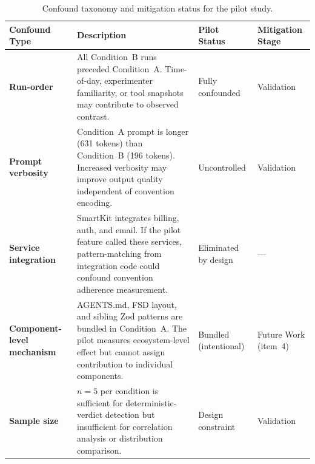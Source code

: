 \begin{table}[ht]
\centering
\footnotesize
\renewcommand{\arraystretch}{1.3}
\caption{Confound taxonomy and mitigation status for the pilot study.}
\label{tbl:confound-taxonomy}
\begin{tabular}{@{}p{3.2cm}p{5.5cm}p{3.8cm}p{2cm}@{}}
\toprule
\textbf{Confound Type} & \textbf{Description} & \textbf{Pilot Status} & \textbf{Mitigation Stage} \\
\midrule
\textbf{Run-order} & All Condition~B runs preceded Condition~A. Time-of-day, experimenter familiarity, or tool snapshots may contribute to observed contrast. & Fully confounded & Validation \\
\addlinespace[0.5em]
\textbf{Prompt verbosity} & Condition~A prompt is longer (631 tokens) than Condition~B (196 tokens). Increased verbosity may improve output quality independent of convention encoding. & Uncontrolled & Validation \\
\addlinespace[0.5em]
\textbf{Service integration} & SmartKit integrates billing, auth, and email. If the pilot feature called these services, pattern-matching from integration code could confound convention adherence measurement. & Eliminated by design & --- \\
\addlinespace[0.5em]
\textbf{Component-level mechanism} & AGENTS.md, FSD layout, and sibling Zod patterns are bundled in Condition~A. The pilot measures ecosystem-level effect but cannot assign contribution to individual components. & Bundled (intentional) & Future Work (item~4) \\
\addlinespace[0.5em]
\textbf{Sample size} & $n=5$ per condition is sufficient for deterministic-verdict detection but insufficient for correlation analysis or distribution comparison. & Design constraint & Validation \\
\bottomrule
\end{tabular}
\end{table}
